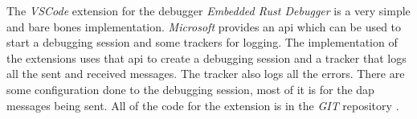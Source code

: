 The \emph{VSCode} extension for the debugger \emph{Embedded Rust Debugger} is a very simple and bare bones implementation.
\emph{Microsoft} provides an \gls{api} which can be used to start a debugging session and some trackers for logging.
The implementation of the extensions uses that \gls{api} to create a debugging session and a tracker that logs all the sent and received messages.
The tracker also logs all the errors.
There are some configuration done to the debugging session, most of it is for the \gls{dap} messages being sent.
All of the code for the extension is in the \emph{GIT} repository \cite{erd-vscode}.


